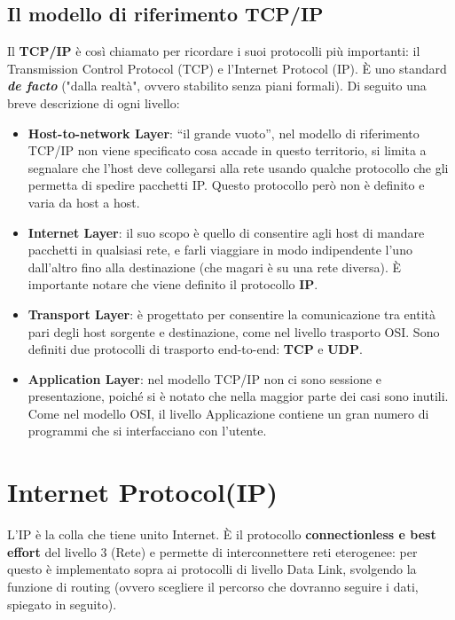         \subsection{Il modello di riferimento TCP/IP}
        Il \textbf{TCP/IP} è così chiamato per ricordare i suoi protocolli più importanti: il Transmission Control
        Protocol (TCP) e l'Internet Protocol (IP). È uno standard \textbf{\textit{de facto}} ("dalla realtà", ovvero
        stabilito senza piani formali). Di seguito una breve descrizione di ogni livello:
        \begin{itemize}
        
            \item \textbf{Host-to-network Layer}: “il grande vuoto”, nel modello di riferimento TCP/IP non viene
                specificato cosa accade in questo territorio, si limita a segnalare che l’host deve collegarsi alla
                rete usando qualche protocollo che gli permetta di spedire pacchetti IP. Questo protocollo però
                non è definito e varia da host a host.
                
            \item \textbf{Internet Layer}: il suo scopo è quello di consentire agli host di mandare pacchetti in qualsiasi
                rete, e farli viaggiare in modo indipendente l’uno dall’altro fino alla destinazione (che magari è
                su una rete diversa). È importante notare che viene definito il protocollo \textbf{IP}.
            
            \item \textbf{Transport Layer}: è progettato per consentire la comunicazione tra entità pari degli host
                sorgente e destinazione, come nel livello trasporto OSI. Sono definiti due protocolli di trasporto
                end-to-end: \textbf{TCP} e \textbf{UDP}.

            \item \textbf{Application Layer}: nel modello TCP/IP non ci sono sessione e presentazione, poiché si è notato
                che nella maggior parte dei casi sono inutili. Come nel modello OSI, il livello Applicazione
                contiene un gran numero di programmi che si interfacciano con l’utente.
        \end{itemize}

    \section{Internet Protocol(IP)}
    L’IP è la colla che tiene unito Internet. È il protocollo \textbf{connectionless e best effort} del livello 3
    (Rete) e permette di interconnettere reti eterogenee: per questo è implementato sopra ai
    protocolli di livello Data Link, svolgendo la funzione di routing (ovvero scegliere il percorso che
    dovranno seguire i dati, spiegato in seguito).
        
